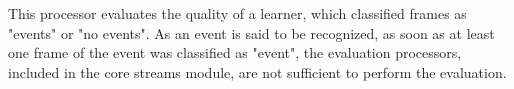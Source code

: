 This processor evaluates the quality of a learner, which classified frames as "events" or "no events". As an event is said to be recognized, as soon as at least one frame of the event was classified as "event", the evaluation processors, included in the core streams module, are not sufficient to perform the evaluation. 